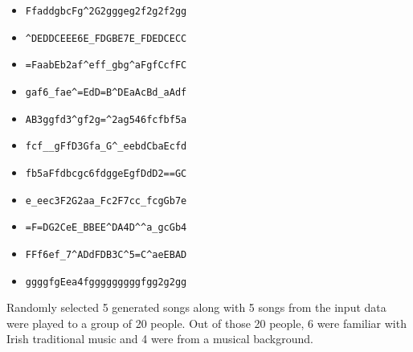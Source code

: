 \documentclass[oneside,12pt]{Classes/RoboticsLaTeX}
\begin{document}
\begin{itemize}
  \item \verb|FfaddgbcFg^2G2gggeg2f2g2f2gg|
\end{itemize}

\begin{itemize}
  \item \verb|^DEDDCEEE6E_FDGBE7E_FDEDCECC|
\end{itemize}

\begin{itemize}
  \item \verb|=FaabEb2af^eff_gbg^aFgfCcfFC|
\end{itemize}

\begin{itemize}
  \item \verb|gaf6_fae^=EdD=B^DEaAcBd_aAdf|
\end{itemize}

\begin{itemize}
  \item \verb|AB3ggfd3^gf2g=^2ag546fcfbf5a|
\end{itemize}

\begin{itemize}
  \item \verb|fcf__gFfD3Gfa_G^_eebdCbaEcfd|
\end{itemize}

\begin{itemize}
  \item \verb|fb5aFfdbcgc6fdggeEgfDdD2==GC|
\end{itemize}

\begin{itemize}
  \item \verb|e_eec3F2G2aa_Fc2F7cc_fcgGb7e|
\end{itemize}

\begin{itemize}
  \item \verb|=F=DG2CeE_BBEE^DA4D^^a_gcGb4|
\end{itemize}

\begin{itemize}
  \item \verb|FFf6ef_7^ADdFDB3C^5=C^aeEBAD|
\end{itemize}

\begin{itemize}
  \item \verb|ggggfgEea4fgggggggggfgg2g2gg|
\end{itemize}

Randomly selected 5 generated songs along with 5 songs from the input data were played to a group of 20 people. Out of those 20 people, 6 were familiar with Irish traditional music and 4 were from a musical background.
\end{document}
